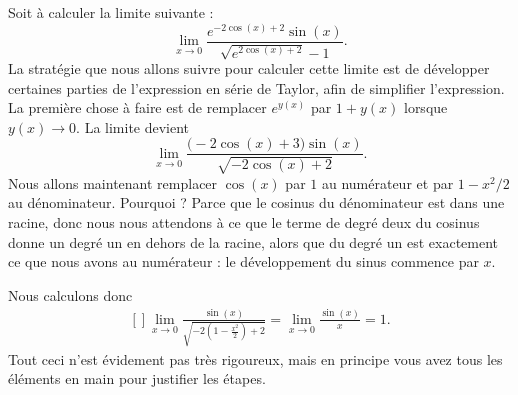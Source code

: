 \begin{example}        \label{EXooINLRooPzRWEA}
    Soit à calculer la limite suivante :
    \begin{equation}
        \lim_{x\to 0} \frac{  e^{-2\cos(x)+2}\sin(x) }{ \sqrt{ e^{2\cos(x)+2}}-1 }.
    \end{equation}
    La stratégie que nous allons suivre pour calculer cette limite est de développer certaines parties de l'expression en série de Taylor, afin de simplifier l'expression. La première chose à faire est de remplacer $ e^{y(x)}$ par $1+y(x)$ lorsque $y(x)\to 0$. La limite devient
    \begin{equation}
        \lim_{x\to 0} \frac{ \big( -2\cos(x)+3 \big)\sin(x) }{ \sqrt{-2\cos(x)+2} }.
    \end{equation}
    Nous allons maintenant remplacer $\cos(x)$ par $1$ au numérateur et par $1-x^2/2$ au dénominateur. Pourquoi ? Parce que le cosinus du dénominateur est dans une racine, donc nous nous attendons à ce que le terme de degré deux du cosinus donne un degré un en dehors de la racine, alors que du degré un est exactement ce que nous avons au numérateur : le développement du sinus commence par $x$.

    Nous calculons donc
    \begin{equation}
        \begin{aligned}[]
            \lim_{x\to 0} \frac{ \sin(x) }{ \sqrt{-2\left( 1-\frac{ x^2 }{ 2 } \right)+2} }=\lim_{x\to 0} \frac{ \sin(x) }{ x }=1.
        \end{aligned}
    \end{equation}
    Tout ceci n'est évidement pas très rigoureux, mais en principe vous avez tous les éléments en main pour justifier les étapes.
\end{example}
